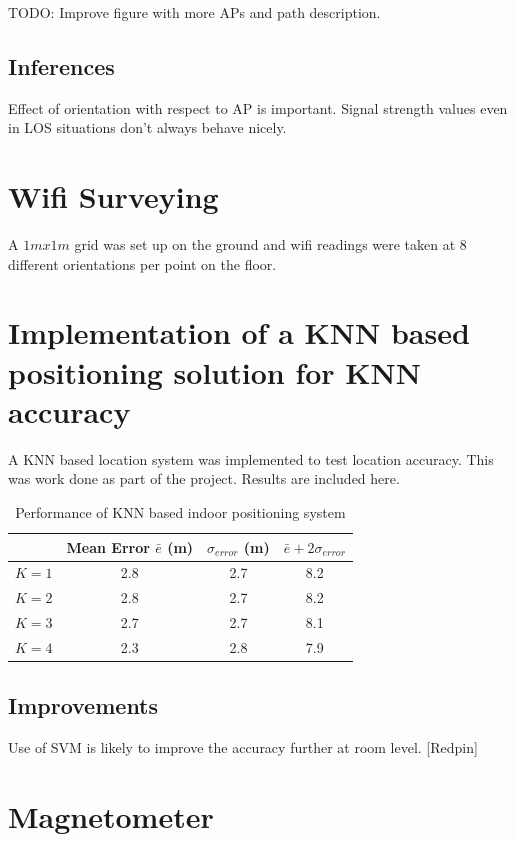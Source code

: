 TODO: Improve figure with more APs and path description.

\subsection{Inferences}
Effect of orientation with respect to AP is important. Signal strength values
even in LOS situations don't always behave nicely.

\section{Wifi Surveying}

A $1m x 1m$ grid was set up on the ground and wifi readings were taken at 8
different orientations per point on the floor.

\clearpage
\section{Implementation of a KNN based positioning solution for KNN accuracy}

A KNN based location system was implemented to test location accuracy. 
This was work done as part of the project. Results are included here.

\begin{table}[h]
    \centering
    \caption{Performance of KNN based indoor positioning system \label{tab:knnperf}}
    \begin{tabular}{|l|c|c|c|}
    \hline
              & Mean Error $\bar{e}$ (m) & $\sigma_{error}$ (m) & $\bar{e} + 2 \sigma_{error}$ \\
    \hline
    \hline
    $K = 1$    & 2.8 & 2.7 & 8.2 \\
    $K = 2$    & 2.8 & 2.7 & 8.2 \\
    $K = 3$    & 2.7 & 2.7 & 8.1 \\
    $K = 4$    & 2.3 & 2.8 & 7.9 \\
    \hline
    \end{tabular}

\end{table}


\subsection{Improvements}
Use of SVM is likely to improve the accuracy further at room level. [Redpin]

\section{Magnetometer}

